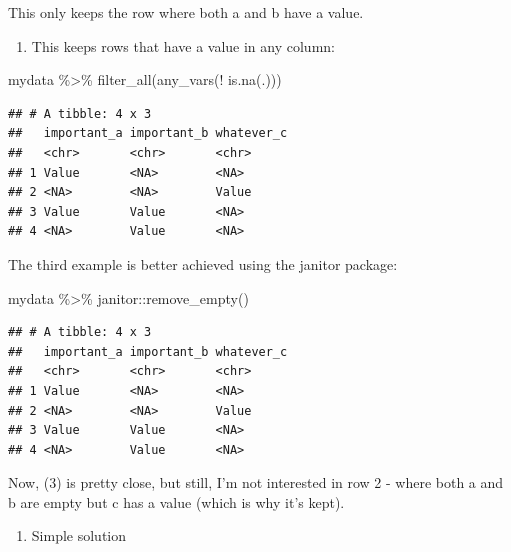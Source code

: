 \documentclass[
]{book}
\newenvironment{Shaded}{\begin{snugshade}}{\end{snugshade}}
\newcommand{\FunctionTok}[1]{\textcolor[rgb]{0.00,0.00,0.00}{#1}}
\newcommand{\NormalTok}[1]{#1}
\newcommand{\SpecialCharTok}[1]{\textcolor[rgb]{0.00,0.00,0.00}{#1}}
\providecommand{\tightlist}{%
  \setlength{\itemsep}{0pt}\setlength{\parskip}{0pt}}
\begin{document}
This only keeps the row where both a and b have a value.

\begin{enumerate}
\def\labelenumi{(\arabic{enumi})}
\setcounter{enumi}{2}
\tightlist
\item
  This keeps rows that have a value in any column:
\end{enumerate}

\begin{Shaded}
\begin{Highlighting}[]
\NormalTok{mydata }\SpecialCharTok{\%\textgreater{}\%} 
  \FunctionTok{filter\_all}\NormalTok{(}\FunctionTok{any\_vars}\NormalTok{(}\SpecialCharTok{!} \FunctionTok{is.na}\NormalTok{(.)))}
\end{Highlighting}
\end{Shaded}

\begin{verbatim}
## # A tibble: 4 x 3
##   important_a important_b whatever_c
##   <chr>       <chr>       <chr>     
## 1 Value       <NA>        <NA>      
## 2 <NA>        <NA>        Value     
## 3 Value       Value       <NA>      
## 4 <NA>        Value       <NA>
\end{verbatim}

The third example is better achieved using the janitor package:

\begin{Shaded}
\begin{Highlighting}[]
\NormalTok{mydata }\SpecialCharTok{\%\textgreater{}\%} 
\NormalTok{  janitor}\SpecialCharTok{::}\FunctionTok{remove\_empty}\NormalTok{()}
\end{Highlighting}
\end{Shaded}

\begin{verbatim}
## # A tibble: 4 x 3
##   important_a important_b whatever_c
##   <chr>       <chr>       <chr>     
## 1 Value       <NA>        <NA>      
## 2 <NA>        <NA>        Value     
## 3 Value       Value       <NA>      
## 4 <NA>        Value       <NA>
\end{verbatim}

Now, (3) is pretty close, but still, I'm not interested in row 2 - where both a and b are empty but c has a value (which is why it's kept).

\begin{enumerate}
\def\labelenumi{(\arabic{enumi})}
\setcounter{enumi}{3}
\tightlist
\item
  Simple solution
\end{enumerate}
\end{document}
